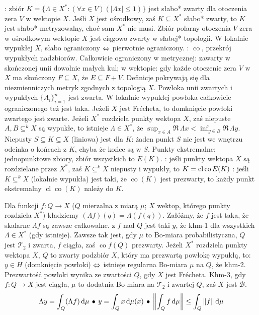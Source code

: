 :  zbiór  $K = \{\Lambda \in X^* : (\forall x \in V) (|\Lambda x| \le 1)\}$ jest słabo* zwarty dla otoczenia zera $V$ w wektopie $X$.
Jeśli $X$ jest ośrodkowy, zaś $K \subseteq X^*$ słabo* zwarty, to $K$ jest słabo* metryzowalny, choć sam $X^*$ nie musi.
Zbiór polarny otoczenia $V$ zera w ośrodkowym wektopie $X$ jest ciągowo zwarty w słabej* topologii.
W lokalnie wypukłej $X$, słabo ograniczony $\Leftrightarrow$ pierwotnie ograniczony.
: $\operatorname{co}$, przekrój wypukłych nadzbiorów.
Całkowicie ograniczony w metrycznej: zawarty w skończonej unii dowolnie małych kul; w wektopie: gdy każde otoczenie zera $V$ w $X$ ma skończony $F \subseteq X$, że $E \subseteq F + V$.
Definicje pokrywają się dla niezmienniczych metryk zgodnych z topologią $X$.
Powłoka unii zwartych i wypukłych $\{A_i\}_{i=1}^n$ jest zwarta.
W lokalnie wypukłej powłoka całkowicie ograniczonego też jest taka.
Jeżeli $X$ jest Frécheta, to domknięcie powłoki zwartego jest zwarte.
Jeżeli $X^*$ rozdziela punkty wektopa $X$, zaś niepuste $A, B \subseteq^k X$ są wypukłe, to istnieje $\Lambda \in X^*$, że $\sup_{x \in A} \Re\, \Lambda x < \inf_{y \in B} \Re\, \Lambda y$.
Niepusty $S \subseteq K \subseteq X$ (liniowa) jest  dla $K$: żaden punkt $S$ nie jest we wnętrzu odcinka o końcach z $K$, chyba że końce są w $S$.
Punkty ekstremalne: jednopunktowe zbiory, zbiór wszystkich to $E(K)$.
: jeśli punkty wektopa $X$ są rozdzielane przez $X^*$, zaś $K \subseteq^k X$ niepusty i wypukły, to $K = \operatorname{cl} \operatorname{co} E(K)$
: jeśli $K\subseteq^k X$ (lokalnie wypukła) jest taki, że $\operatorname{co} (K)$ jest prezwarty, to każdy punkt ekstremalny $\operatorname{cl} \operatorname{co} (K)$ należy do $K$.

Dla  funkcji $f \colon Q \to X$ ($Q$ mierzalna z miarą $\mu$; $X$ wektop, którego punkty rozdziela $X^*$) kładziemy $(\Lambda f)(q) = \Lambda(f(q))$.
Załóżmy, że $f$ jest taka, że skalarne $\Lambda f$ są zawsze całkowalne.
 z $f$ nad $Q$ jest taki $y$, że khm-1 dla wszystkich $\Lambda \in X^*$ (gdy istnieje).
Zawsze tak jest, gdy $\mu$ to Bo-miara probabilistyczna, $Q$ jest $\mathcal T_2$ i zwarta, $f$ ciągła, zaś $\operatorname{co} f(Q)$ prezwarty.
Jeżeli $X^*$ rozdziela punkty wektopa $X$, $Q$ to zwarty podzbiór $X$, który ma prezwartą powłokę wypukłą, to: $y \in H$ (domknięcie powłoki) $\Leftrightarrow$ istnieje regularna Bo-miara $\mu$ na $Q$, że khm-2.
Prezwartość powłoki wynika ze zwartości $Q$, gdy $X$ jest Frécheta.
Khm-3, gdy $f \colon Q \to X$ jest ciągła, $\mu$ to dodatnia Bo-miara na $\mathcal T_2$ i zwartej $Q$, zaś $X$ jest $\mathscr B$.
\[
	\Lambda y = \int_Q (\Lambda f) \,\textrm d \mu \, \bullet \,
	y = \int_Q x \,\textrm{d} \mu(x) \, \bullet \,
	\left\| \int_Q f \,\textrm{d}\mu \right\| \le \int_Q \|f\| \,\textrm{d}\mu
\]

